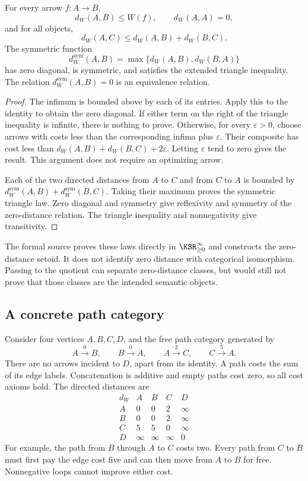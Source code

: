 \begin{KSproposition}\label{KS:KS78}
For every arrow \(f:A\to B\),
\[
 d_W(A,B)\le W(f),\qquad d_W(A,A)=0,
\]
and for all objects,
\[
 d_W(A,C)\le d_W(A,B)+d_W(B,C).
\]
The symmetric function
\[
 d_W^{\mathrm{sym}}(A,B)=\max\{d_W(A,B),d_W(B,A)\}
\]
has zero diagonal, is symmetric, and satisfies the extended triangle inequality. The relation \(d_W^{\mathrm{sym}}(A,B)=0\) is an equivalence relation.
\end{KSproposition}
\begin{proof}
The infimum is bounded above by each of its entries. Apply this to the identity to obtain the zero diagonal. If either term on the right of the triangle inequality is infinite, there is nothing to prove. Otherwise, for every \(\varepsilon>0\), choose arrows with costs less than the corresponding infima plus \(\varepsilon\). Their composite has cost less than
\(d_W(A,B)+d_W(B,C)+2\varepsilon\). Letting \(\varepsilon\) tend to zero gives the result. This argument does not require an optimizing arrow.

Each of the two directed distances from \(A\) to \(C\) and from \(C\) to \(A\) is bounded by \(d_W^{\mathrm{sym}}(A,B)+d_W^{\mathrm{sym}}(B,C)\). Taking their maximum proves the symmetric triangle law. Zero diagonal and symmetry give reflexivity and symmetry of the zero-distance relation. The triangle inequality and nonnegativity give transitivity.
\end{proof}
The formal source proves these laws directly in \(\KSR_{\ge0}^{\infty}\) and constructs the zero-distance setoid. It does not identify zero distance with categorical isomorphism. Passing to the quotient can separate zero-distance classes, but would still not prove that those classes are the intended semantic objects.

\subsection{A concrete path category}
Consider four vertices \(A,B,C,D\), and the free path category generated by
\[
 A\xrightarrow{0}B,\qquad B\xrightarrow{0}A,\qquad
 A\xrightarrow{2}C,\qquad C\xrightarrow{5}A.
\]
There are no arrows incident to \(D\), apart from its identity. A path costs the sum of its edge labels. Concatenation is additive and empty paths cost zero, so all cost axioms hold. The directed distances are
\[
 \begin{array}{c|rrrr}
 d_W&A&B&C&D\\\hline
 A&0&0&2&\infty\\
 B&0&0&2&\infty\\
 C&5&5&0&\infty\\
 D&\infty&\infty&\infty&0
 \end{array}
\]
For example, the path from \(B\) through \(A\) to \(C\) costs two. Every path from \(C\) to \(B\) must first pay the edge cost five and can then move from \(A\) to \(B\) for free. Nonnegative loops cannot improve either cost.

